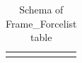 \documentclass[12pt]{article}
\begin{document}
\begin{table}[thbp]
\begin{center}
{\begin{tabular}{llllll}
\hline\\
\end{tabular}
}
\caption{Schema of Frame\_Forcelist table}
\end{center}
\end{table}
\end{document}
